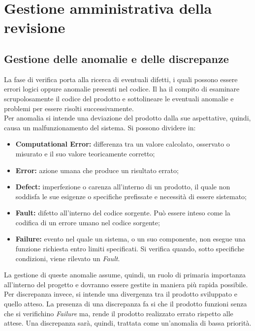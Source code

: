%


\section{Gestione amministrativa della revisione}

	\subsection{Gestione delle anomalie e delle discrepanze}
	La fase di verifica porta alla ricerca di eventuali difetti, i quali possono essere errori logici oppure anomalie presenti nel codice. Il \roleVerifier{} ha il compito di esaminare scrupolosamente il codice del prodotto e sottolineare le eventuali anomalie e problemi per essere risolti successivamente.\\
	Per anomalia si intende una deviazione del prodotto dalla sue aspettative, quindi, causa un malfunzionamento del sistema. Si possono dividere in:
	\begin{itemize}
		\item \textbf{Computational Error:} differenza tra un valore calcolato, osservato o misurato e il suo valore teoricamente corretto;
		\item \textbf{Error:} azione umana che produce un risultato errato;
		\item \textbf{Defect:} imperfezione o carenza all'interno di un prodotto, il quale non soddisfa le sue esigenze o specifiche prefissate e necessità di essere sistemato;
		\item \textbf{Fault:} difetto all'interno del codice sorgente. Può essere inteso come la codifica di un errore umano nel codice sorgente;
		\item \textbf{Failure:} evento nel quale un sistema, o un suo componente, non esegue una funzione richiesta entro limiti specificati. Si verifica quando, sotto specifiche condizioni, viene rilevato un \emph{Fault}.
	\end{itemize}
	La gestione di queste anomalie assume, quindi, un ruolo di primaria importanza all'interno del progetto e dovranno essere gestite in maniera più rapida possibile.\\
	Per discrepanza invece, si intende una divergenza tra il prodotto sviluppato e quello atteso. La presenza di una discrepanza fa si che il prodotto funzioni senza che si verifichino \emph{Failure} ma, rende il prodotto realizzato errato rispetto alle attese. Una discrepanza sarà, quindi, trattata come un'anomalia di bassa priorità.
	
